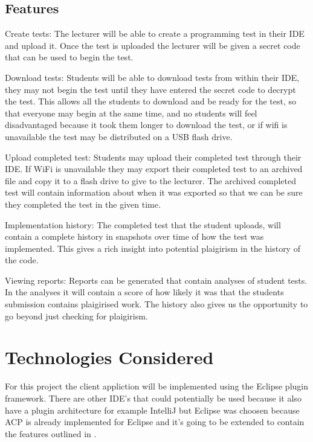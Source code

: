 \documentclass[twocolumn]{article}
\begin{document}
\subsection{Features} \label{sec:Features}
Create tests: The lecturer will be able to create a programming test in their
IDE and upload it. Once the test is uploaded the lecturer will be given a secret
code that can be used to begin the test.

Download tests: Students will be able to download tests from within their IDE,
they may not begin the test until they have entered the secret code to decrypt
the test. This allows all the students to download and be ready for the test, so
that everyone may begin at the same time, and no students will feel
disadvantaged because it took them longer to download the test, or if wifi is
unavailable the test may be distributed on a USB flash drive.

Upload completed test: Students may upload their completed test through their
IDE. If WiFi is unavailable they may export their completed test to an archived
file and copy it to a flash drive to give to the lecturer. The archived
completed test will contain information about when it was exported so that we
can be sure they completed the test in the given time.

Implementation history: The completed test that the student uploads, will
contain a complete history in snapshots over time of how the test was
implemented. This gives a rich insight into potential plaigirism in the history
of the code.

Viewing reports: Reports can be generated that contain analyses of student
tests. In the analyses it will contain a score of how likely it was that the
students submission contains plaigirised work. The history also gives us the
opportunity to go beyond just checking for plaigirism.
\section{Technologies Considered}
For this project the client appliction will be implemented using the Eclipse
plugin framework. There are other IDE's that could potentially be used because
it also have a plugin architecture for example IntelliJ but Eclipse was choosen
because ACP is already implemented for Eclipse and it's going to be extended to
contain the features outlined in .
\end{document}
